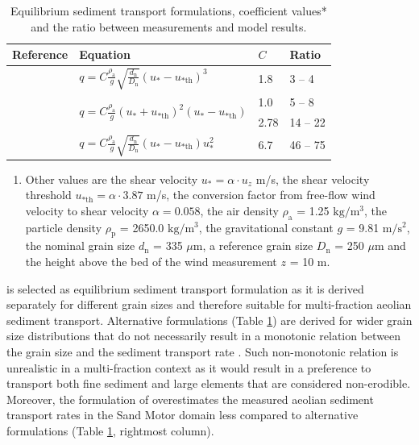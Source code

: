 \documentclass[preprint,12pt,authoryear]{elsarticle}
\begin{document}
\begin{table}
  \centering
  \caption{Equilibrium sediment transport formulations, coefficient
    values* and the ratio between measurements and model results.}
  \label{tab:models}
  \begin{tabular}{llll}
    Reference & Equation & $C$ & Ratio \\
    \hline
    \citet{Bagnold1937a} & $q = C \frac{\rho_{\mathrm{a}}}{g} \sqrt{\frac{d_{\mathrm{n}}}{D_{\mathrm{n}}}} \left(u_{\mathrm{*}} - u_{\mathrm{* th}} \right)^3$ & 1.8 & 3 -- 4 \\
    \citet{Horikawa1983} & \multirow{2}{*}{$q = C \frac{\rho_{\mathrm{a}}}{g} \left(u_{\mathrm{*}} + u_{\mathrm{* th}} \right)^2 \left(u_{\mathrm{*}} - u_{\mathrm{* th}} \right)$} & 1.0 & 5 -- 8 \\
    \citet{Kawamura1951} &  & 2.78 & 14 -- 22 \\
    \citet{Lettau1978} & $q = C \frac{\rho_{\mathrm{a}}}{g} \sqrt{\frac{d_{\mathrm{n}}}{D_{\mathrm{n}}}} \left(u_{\mathrm{*}} - u_{\mathrm{* th}} \right) u_{\mathrm{*}}^2$ & 6.7 & 46 -- 75 \\
  \end{tabular}

  \footnotesize{
    \begin{enumerate}[{*}]
    \item Other values are the shear velocity
      $u_{\mathrm{*}} = \alpha \cdot u_z$ m/s, the shear velocity
      threshold $u_{\mathrm{* th}} = \alpha \cdot 3.87$ m/s, the
      conversion factor from free-flow wind velocity to shear velocity
      $\alpha = 0.058$, the air density $\rho_{\mathrm{a}}$ = 1.25
      $\mathrm{kg/m^3}$, the particle density $\rho_{\mathrm{p}}$ =
      2650.0 $\mathrm{kg/m^3}$, the gravitational constant $g$ = 9.81
      $\mathrm{m/s^2}$, the nominal grain size $d_{\mathrm{n}}$ = 335
      $\mu \mathrm{m}$, a reference grain size $D_{\mathrm{n}}$ = 250
      $\mu \mathrm{m}$ and the height above the bed of the wind
      measurement $z$ = 10 m.
    \end{enumerate}
  }
\end{table}

\citet{Bagnold1937a} is selected as equilibrium sediment transport
formulation as it is derived separately for different grain sizes and
therefore suitable for multi-fraction aeolian sediment
transport. Alternative formulations (Table \ref{tab:models}) are
derived for wider grain size distributions that do not necessarily
result in a monotonic relation between the grain size and the sediment
transport rate \citep[e.g.][]{Kawamura1951, Horikawa1983}. Such
non-monotonic relation is unrealistic in a multi-fraction context as
it would result in a preference to transport both fine sediment and
large elements that are considered non-erodible. Moreover, the
formulation of \citet{Bagnold1937a} overestimates the measured aeolian
sediment transport rates in the Sand Motor domain less compared to
alternative formulations (Table \ref{tab:models}, rightmost column).
\end{document}
